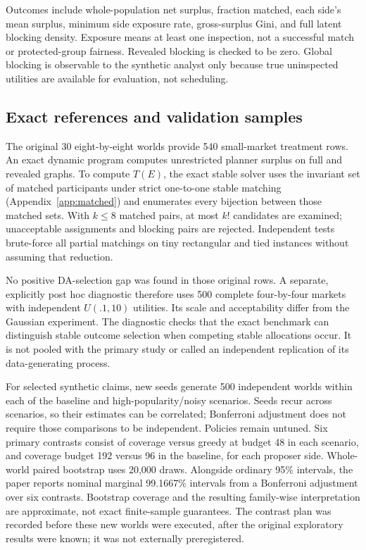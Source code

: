 \documentclass[11pt,a4paper]{article}
\begin{document}
Outcomes include whole-population net surplus, fraction matched, each side's mean surplus, minimum side exposure rate, gross-surplus Gini, and full latent blocking density. Exposure means at least one inspection, not a successful match or protected-group fairness. Revealed blocking is checked to be zero. Global blocking is observable to the synthetic analyst only because true uninspected utilities are available for evaluation, not scheduling.

\subsection{Exact references and validation samples}
The original 30 eight-by-eight worlds provide 540 small-market treatment rows. An exact dynamic program computes unrestricted planner surplus on full and revealed graphs. To compute $T(E)$, the exact stable solver uses the invariant set of matched participants under strict one-to-one stable matching (Appendix~\ref{app:matched}) and enumerates every bijection between those matched sets. With $k\le8$ matched pairs, at most $k!$ candidates are examined; unacceptable assignments and blocking pairs are rejected. Independent tests brute-force all partial matchings on tiny rectangular and tied instances without assuming that reduction.

No positive DA-selection gap was found in those original rows. A separate, explicitly post hoc diagnostic therefore uses 500 complete four-by-four markets with independent $U(.1,10)$ utilities. Its scale and acceptability differ from the Gaussian experiment. The diagnostic checks that the exact benchmark can distinguish stable outcome selection when competing stable allocations occur. It is not pooled with the primary study or called an independent replication of its data-generating process.

For selected synthetic claims, new seeds generate 500 independent worlds within each of the baseline and high-popularity/noisy scenarios. Seeds recur across scenarios, so their estimates can be correlated; Bonferroni adjustment does not require those comparisons to be independent. Policies remain untuned. Six primary contrasts consist of coverage versus greedy at budget 48 in each scenario, and coverage budget 192 versus 96 in the baseline, for each proposer side. Whole-world paired bootstrap uses 20,000 draws. Alongside ordinary 95\% intervals, the paper reports nominal marginal 99.1667\% intervals from a Bonferroni adjustment over six contrasts. Bootstrap coverage and the resulting family-wise interpretation are approximate, not exact finite-sample guarantees. The contrast plan was recorded before these new worlds were executed, after the original exploratory results were known; it was not externally preregistered.
\end{document}
